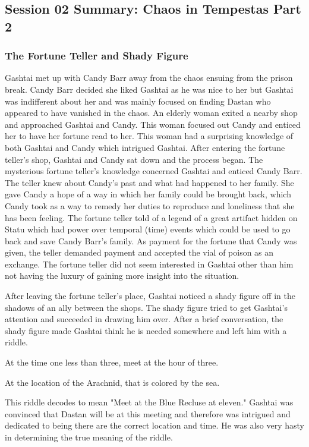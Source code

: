 \subsection{Session 02 Summary: Chaos in Tempestas Part 2}

\subsubsection{The Fortune Teller and Shady Figure}

Gashtai met up with Candy Barr away from the chaos ensuing from the prison break. Candy Barr decided she liked Gashtai as he was nice to her but Gashtai was indifferent about her and was mainly focused on finding Dastan who appeared to have vanished in the chaos. An elderly woman exited a nearby shop and approached Gashtai and Candy. This woman focused out Candy and enticed her to have her fortune read to her. This woman had a surprising knowledge of both Gashtai and Candy which intrigued Gashtai. After entering the fortune teller's shop, Gashtai and Candy sat down and the process began. The mysterious fortune teller's knowledge concerned Gashtai and enticed Candy Barr. The teller knew about Candy's past and what had happened to her family. She gave Candy a hope of a way in which her family could be brought back, which Candy took as a way to remedy her duties to reproduce and loneliness that she has been feeling. The fortune teller told of a legend of a great artifact hidden on Statu which had power over temporal (time) events which could be used to go back and save Candy Barr's family. As payment for the fortune that Candy was given, the teller demanded payment and accepted the vial of poison as an exchange. The fortune teller did not seem interested in Gashtai other than him not having the luxury of gaining more insight into the situation.

After leaving the fortune teller's place, Gashtai noticed a shady figure off in the shadows of an ally between the shops. The shady figure tried to get Gashtai's attention and succeeded in drawing him over. After a brief conversation, the shady figure made Gashtai think he is needed somewhere and left him with a riddle.

\begin{center}
	At the time one less than three, meet at the hour of three.
	
	At the location of the Arachnid, that is colored by the sea.
\end{center}

This riddle decodes to mean "Meet at the Blue Recluse at eleven." Gashtai was convinced that Dastan will be at this meeting and therefore was intrigued and dedicated to being there are the correct location and time. He was also very hasty in determining the true meaning of the riddle. 

